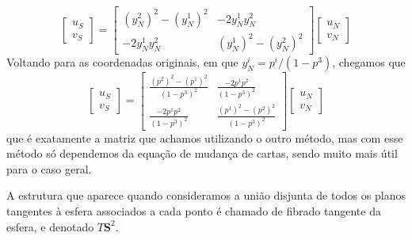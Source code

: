 \documentclass[a4paper,12pt,notitlepage]{article}
\renewcommand{\S}{\mathbf{S}}
\begin{document}
	\begin{equation}
		\begin{bmatrix}
		u_S\\v_S
		\end{bmatrix}=\begin{bmatrix}
		(y_N^2)^2-(y_N^1)^2 & -2y_N^1y_N^2\\
		-2y_N^1y_N^2 & (y_N^1)^2-(y_N^2)^2
		\end{bmatrix}\begin{bmatrix}
		u_N\\v_N
		\end{bmatrix}
	\end{equation}
	Voltando para as coordenadas originais, em que $y^i_N=p^i/(1-p^3)$, chegamos que
	\begin{equation}
	\begin{bmatrix}
	u_S\\v_S
	\end{bmatrix}=\begin{bmatrix}
	\frac{(p^2)^2-(p^1)^2}{(1-p^3)^2} & \frac{-2p^1p^2}{(1-p^3)^2}\\
	\frac{-2p^1p^2}{(1-p^3)^2} & \frac{(p^1)^2-(p^2)^2}{(1-p^3)^2}
	\end{bmatrix}\begin{bmatrix}
	u_N\\v_N
	\end{bmatrix}
	\end{equation}
	que é exatamente a matriz que achamos utilizando o outro método, mas com esse método só dependemos da equação de mudança de cartas, sendo muito mais útil para o caso geral.
	
	A estrutura que aparece quando consideramos a união disjunta de todos os planos tangentes à esfera associados a cada ponto é chamado de fibrado tangente da esfera, e denotado $T\S^2$.
	
\end{document}
